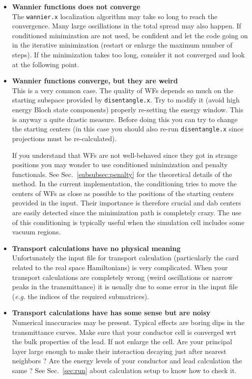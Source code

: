 \begin{itemize}
\item   {\bf Wannier functions does not converge} \\
        The {\tt wannier.x} localization algorithm may take so long to reach the
        convergence. Many large oscillations in the total spread may also happen.
        If conditioned minimization are not used, be confident and let the code
        going on in the iterative minimization (restart or enlarge the maximum number
        of steps). If the minimization takes too long, consider it not converged and
        look at the following point.

\item   {\bf Wannier functions converge, but they are weird } \\
        This is a very common case. The quality of WFs depends so much on the starting
        subspace provided by {\tt disentangle.x}. Try to modify it (avoid high
        energy Bloch state components) properly re-setting the energy window.
        This is anyway a quite drastic measure. Before doing this you can try to
        change the starting centers (in this case you should also re-run
        {\tt disentangle.x} since projections must be re-calculated).

        If you understand that WFs are not well-behaved since they got in strange
        positions you may wonder to use conditioned minimization and penalty functionals.
        See Sec.~\ref{subsubsec:penalty} for the theoretical details of the method.
        In the current implementation, the conditioning tries to move the centers of
        WFs as close as possible to the positions of the starting centers provided
        in the input. Their importance is therefore crucial and dab centers are
        easily detected since the minimization path is completely crazy.
        The use of this conditioning is typically useful when the simulation cell
        includes some vacuum regions.

\item   {\bf Transport calculations have no physical meaning } \\
        Unfortunately the input file for transport calculation (particularly the
        card related to the real space Hamiltonians) is very complicated.
        When your transport calculations are completely wrong (weird oscillations or
        narrow peaks in the transmittance) it is usually due to some error in
        the input file ({\it e.g.} the indices of the required submatrices).

\item   {\bf Transport calculations have has some sense but are noisy} \\
        Numerical inaccuracies may be present. Typical effects are boring dips
        in the transmittance curves. Make sure that your conductor
        cell is converged wrt the bulk properties of the lead. If not enlarge the cell.
        Are your principal layer large enough to make their interaction decaying
        just after nearest neighbors ?
        Are the energy levels of your conductor and lead calculation the same ?
        See Sec.~\ref{sec:run} about calculation setup to know how to check it.

\end{itemize}
